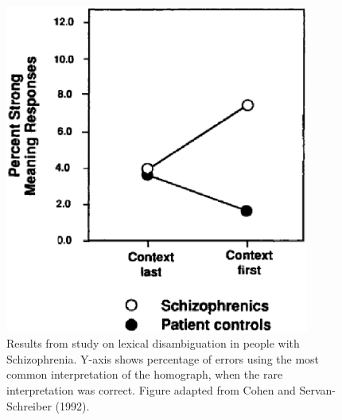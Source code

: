 \documentclass[man]{apa}
\begin{document}
\begin{figure}[tp]
\begin{center}
	\includegraphics[width=100mm]{figures/schiz_lexamb_study_results.eps}
\end{center}
\caption{Results from study on lexical disambiguation in people with Schizophrenia.  Y-axis shows percentage of errors using the most common interpretation of the homograph, when the rare interpretation was correct.  Figure adapted from Cohen and Servan-Schreiber (1992).}
\label{schiz-lexamb-study}
\end{figure} 
\end{document}
